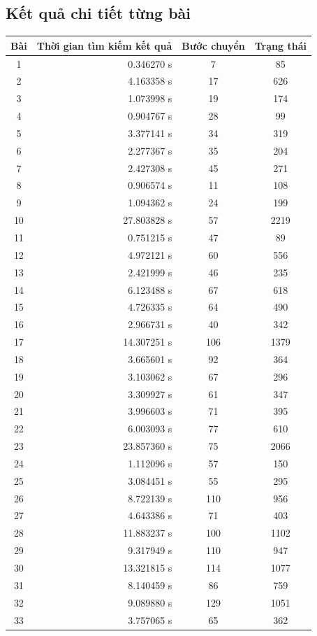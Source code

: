 \documentclass[11pt,a4paper]{article}
\begin{document}
\subsection{Kết quả chi tiết từng bài}
\begin{center}
	\begin{tabular}{|c|r|c|c|}
		\hline
		Bài & Thời gian tìm kiếm kết quả & Bước chuyển & Trạng thái \\ \hline
		1   & 0.346270 s	& 7		& 85 \\ \hline
		2   & 4.163358 s	& 17	& 626 \\ \hline
		3	& 1.073998 s	& 19	& 174 \\ \hline
		4 	& 0.904767 s	& 28	& 99 \\ \hline
		5	& 3.377141 s	& 34	& 319 \\ \hline
		6	& 2.277367 s	& 35	& 204 \\ \hline
		7	& 2.427308 s	& 45	& 271 \\ \hline
		8	& 0.906574 s	& 11	& 108 \\ \hline
		9	& 1.094362 s	& 24	& 199 \\ \hline
		10	& 27.803828 s	& 57	& 2219 \\ \hline
		11	& 0.751215 s	& 47	& 89 \\ \hline
		12	& 4.972121 s	& 60	& 556 \\ \hline
		13	& 2.421999 s	& 46	& 235 \\ \hline
		14	& 6.123488 s	& 67	& 618 \\ \hline
		15	& 4.726335 s	& 64	& 490 \\ \hline
		16	& 2.966731 s	& 40	& 342 \\ \hline
		17	& 14.307251 s	& 106	& 1379 \\ \hline
		18	& 3.665601 s	& 92	& 364 \\ \hline
		19	& 3.103062 s	& 67	& 296 \\ \hline
		20	& 3.309927 s	& 61	& 347 \\ \hline
		21	& 3.996603 s	& 71	& 395 \\ \hline
		22	& 6.003093 s	& 77	& 610 \\ \hline
		23	& 23.857360 s	& 75	& 2066 \\ \hline
		24	& 1.112096 s	& 57	& 150 \\ \hline
		25	& 3.084451 s	& 55	& 295 \\ \hline
		26	& 8.722139 s	& 110	& 956 \\ \hline
		27	& 4.643386 s	& 71	& 403 \\ \hline
		28	& 11.883237 s	& 100	& 1102 \\ \hline
		29	& 9.317949 s	& 110	& 947 \\ \hline
		30	& 13.321815 s	& 114	& 1077 \\ \hline
		31	& 8.140459 s	& 86	& 759 \\ \hline
		32	& 9.089880 s	& 129	& 1051 \\ \hline
		33	& 3.757065 s	& 65	& 362 \\ \hline
	\end{tabular}	
\end{center}
\newpage
\end{document}
